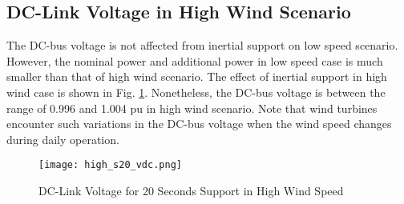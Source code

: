 \subsection{DC-Link Voltage in High Wind Scenario}
The DC-bus voltage is not affected from inertial support on low speed scenario. However, the nominal power and additional power in low speed case is much smaller than that of high wind scenario. The effect of inertial support in high wind case is shown in Fig. \ref{high_s20_vdc}. Nonetheless, the DC-bus voltage is between the range of 0.996 and 1.004 pu in high wind scenario. Note that wind turbines encounter such variations in the DC-bus voltage when the wind speed changes during daily operation. 
\begin{figure}[h!]
	\centering
	\texttt{[image: high\_s20\_vdc.png]}
	\caption{DC-Link Voltage for 20 Seconds Support in High Wind Speed}
	\label{high_s20_vdc}
\end{figure}